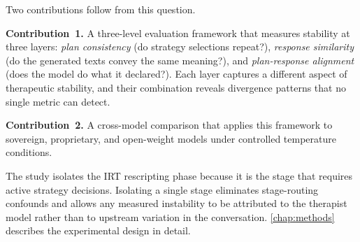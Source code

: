 \noindent Two contributions follow from this question.

\textbf{Contribution~1.}
A three-level evaluation framework that measures stability at three layers: \emph{plan consistency} (do strategy selections repeat?), \emph{response similarity} (do the generated texts convey the same meaning?), and \emph{plan-response alignment} (does the model do what it declared?).
Each layer captures a different aspect of therapeutic stability, and their combination reveals divergence patterns that no single metric can detect.

\textbf{Contribution~2.}
A cross-model comparison that applies this framework to sovereign, proprietary, and open-weight models under controlled temperature conditions.

The study isolates the IRT rescripting phase because it is the stage that requires active strategy decisions.
Isolating a single stage eliminates stage-routing confounds and allows any measured instability to be attributed to the therapist model rather than to upstream variation in the conversation.
\autoref{chap:methods} describes the experimental design in detail.
